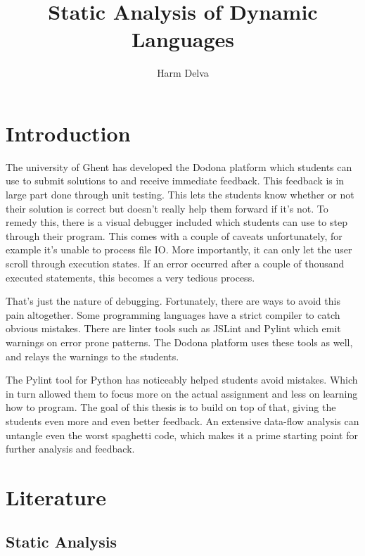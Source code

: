 \documentclass[]{article}
\title{Static Analysis of Dynamic Languages}
\author{Harm Delva}
\date{}
\begin{document}
\tableofcontents

\maketitle

\section{Introduction}\label{introduction}

The university of Ghent has developed the Dodona platform which students
can use to submit solutions to and receive immediate feedback. This
feedback is in large part done through unit testing. This lets the
students know whether or not their solution is correct but doesn't
really help them forward if it's not. To remedy this, there is a visual
debugger included which students can use to step through their program.
This comes with a couple of caveats unfortunately, for example it's
unable to process file IO. More importantly, it can only let the user
scroll through execution states. If an error occurred after a couple of
thousand executed statements, this becomes a very tedious process.

That's just the nature of debugging. Fortunately, there are ways to
avoid this pain altogether. Some programming languages have a strict
compiler to catch obvious mistakes. There are linter tools such as
JSLint and Pylint which emit warnings on error prone patterns. The
Dodona platform uses these tools as well, and relays the warnings to the
students.

The Pylint tool for Python has noticeably helped students avoid
mistakes. Which in turn allowed them to focus more on the actual
assignment and less on learning how to program. The goal of this thesis
is to build on top of that, giving the students even more and even
better feedback. An extensive data-flow analysis can untangle even the
worst spaghetti code, which makes it a prime starting point for further
analysis and feedback.

\section{Literature}\label{literature}

\subsection{Static Analysis}\label{static-analysis}
\end{document}

